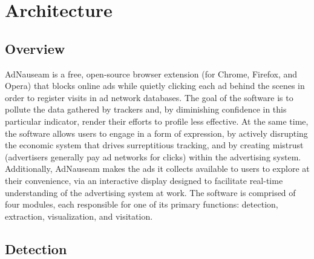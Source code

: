 \documentclass[conference]{IEEEtran}
\begin{document}
\section{Architecture}

\subsection{Overview}

AdNauseam is a free, open-source browser extension (for Chrome, Firefox, and Opera) that blocks online ads while quietly clicking each ad behind the scenes in order to register visits in ad network databases. The goal of the software is to pollute the data gathered by trackers and, by diminishing confidence in this particular indicator, render their efforts to profile less effective. At the same time, the software allows users to engage in a form of expression, by actively disrupting the economic system that drives surreptitious tracking, and by creating mistrust (advertisers generally pay ad networks for clicks) within the advertising system. Additionally, AdNauseam makes the ads it collects available to users to explore at their convenience, via an interactive display designed to facilitate real-time understanding of the advertising system at work. The software is comprised of four modules, each responsible for one of its primary functions: detection, extraction, visualization, and visitation.

\subsection{Detection}
\end{document}
